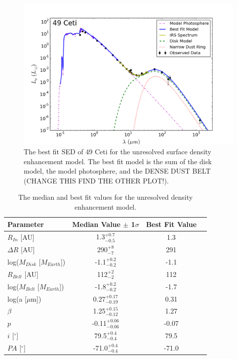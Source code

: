 {{\begin{figure}
\label{fig:49CET_BonusBeltSED_ModelResidual}
\end{figure}
\begin{figure}%
\centering
\includegraphics[width = 1\textwidth]{49CET_BonusBeltSED_SED.png}
\caption{The best fit SED of 49 Ceti for the unresolved surface density enhancement model. The best fit model is the sum of the disk model, the model photosphere, and the DENSE DUST BELT (CHANGE THIS FIND THE OTHER PLOT!).}
\label{fig:49CET_BonusBeltSED_SED}
\end{figure}
\begin{table}
\begin{center}
    \def\arraystretch{1.37}%
    \begin{tabular}{l*{2}{c}r}
    \hline
    Parameter & Median Value $\pm$ 1$\sigma$ & Best Fit Value \\ \hline
     $R_{In}$  [AU] & 1.3$^{+0.7}_{-0.5}$ & 1.3\\  
     $\Delta R$ [AU] & 290$^{+8}_{-7}$ & 291\\ 
     log($M_{Disk}$ [$M_{Earth}$]) & -1.1$^{+0.2}_{-0.2}$ & -1.1 \\
     $R_{Belt}$  [AU] & 112$^{+2}_{-2}$ & 112\\ 
     log($M_{Belt}$ [$M_{Earth}$]) & -1.8$^{+0.2}_{-0.2}$ & -1.7\\
     log(a [$\mu$m]) & 0.27$^{+0.17}_{-0.19}$ & 0.31\\ 
     $\beta$ & 1.25$^{+0.15}_{-0.12}$ & 1.27\\ 
     $p$ & -0.11$^{+0.06}_{-0.06}$ & -0.07\\ 
     $i$ [$^\circ$] & 79.5$^{+0.4}_{-0.4}$ & 79.5 \\ 
     $PA$ [$^\circ$] & -71.0$^{+0.4}_{-0.4}$ & -71.0\\
    \hline
    \end{tabular}
\end{center}
\caption{The median and best fit values for the unresolved density enhancement model.}
\label{tab:49CET_BonusBeltSED_Table}
\end{table}

}}

